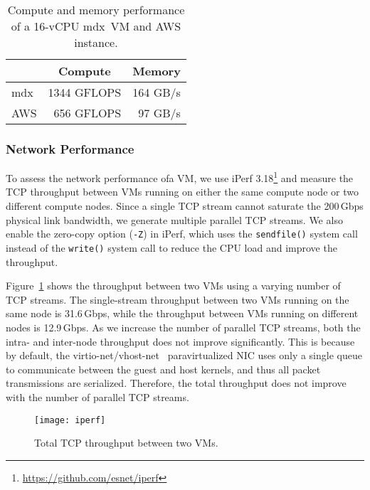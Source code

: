 \documentclass[a4paper,twoside]{article}
\newcommand{\mdx}{mdx\,\uppercase\expandafter{\romannumeral 2\relax}}
\begin{document}
\begin{table}
\centering
\caption{Compute and memory performance of a 16-vCPU \mdx{} VM and AWS instance.}\label{tbl:cm}
\begin{tabular}{@{}lrr@{}}
\toprule
\multicolumn{1}{c}{} & \multicolumn{1}{c}{Compute} & \multicolumn{1}{c}{Memory} \\ \midrule
\mdx{}               & 1344 GFLOPS                 & 164 GB/s                   \\
AWS                  & 656 GFLOPS                  & 97 GB/s                    \\ \bottomrule
\end{tabular}
\end{table}

\subsubsection{Network Performance}

To assess the network performance ofa VM, we use iPerf
3.18\footnote{\url{https://github.com/esnet/iperf}} and measure the TCP throughput between VMs
running on either the same compute node or two different compute nodes.
Since a single TCP stream cannot saturate the 200\,Gbps physical
link bandwidth, we generate multiple parallel TCP streams. We also enable the zero-copy option
(\verb|-Z|) in iPerf, which uses the \verb|sendfile()| system call instead of the \verb|write()|
system call to reduce the CPU load and improve the throughput.

Figure~\ref{fig:iperf} shows the throughput between two VMs using a varying number of TCP
streams. The single-stream throughput between two VMs running on the same node is 31.6\,Gbps, while
the throughput between VMs running on different nodes is 12.9\,Gbps. As we increase the number of
parallel TCP streams, both the intra- and inter-node throughput does not improve significantly.
This is because by
default, the virtio-net/vhost-net~\cite{Bugnion2017} paravirtualized NIC uses only a single queue to
communicate between the guest and host kernels, and thus all packet transmissions are serialized.
Therefore, the total throughput does not improve with the number of parallel TCP streams.

\begin{figure}
    \centering
    \texttt{[image: iperf]}%
    \caption{Total TCP throughput between two VMs.}\label{fig:iperf}
\end{figure}
\end{document}
